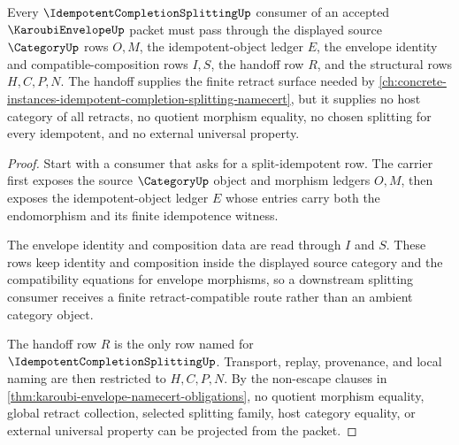 \begin{theorem}
\label{thm:karoubi-envelope-split-idempotent-handoff}
Every $\IdempotentCompletionSplittingUp$ consumer of an accepted $\KaroubiEnvelopeUp$ packet must pass through the displayed source $\CategoryUp$ rows $O,M$, the idempotent-object ledger $E$, the envelope identity and compatible-composition rows $I,S$, the handoff row $R$, and the structural rows $H,C,P,N$. The handoff supplies the finite retract surface needed by \autoref{ch:concrete-instances-idempotent-completion-splitting-namecert}, but it supplies no host category of all retracts, no quotient morphism equality, no chosen splitting for every idempotent, and no external universal property.
\end{theorem}
\begin{proof}
Start with a consumer that asks for a split-idempotent row. The carrier first exposes the source $\CategoryUp$ object and morphism ledgers $O,M$, then exposes the idempotent-object ledger $E$ whose entries carry both the endomorphism and its finite idempotence witness.

The envelope identity and composition data are read through $I$ and $S$. These rows keep identity and composition inside the displayed source category and the compatibility equations for envelope morphisms, so a downstream splitting consumer receives a finite retract-compatible route rather than an ambient category object.

The handoff row $R$ is the only row named for $\IdempotentCompletionSplittingUp$. Transport, replay, provenance, and local naming are then restricted to $H,C,P,N$. By the non-escape clauses in \autoref{thm:karoubi-envelope-namecert-obligations}, no quotient morphism equality, global retract collection, selected splitting family, host category equality, or external universal property can be projected from the packet.
\end{proof}



